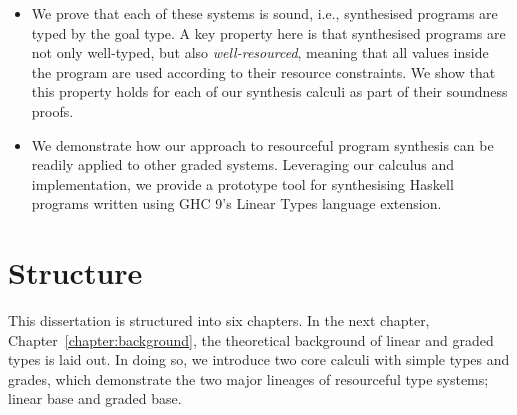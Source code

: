 \begin{itemize}
  \item We prove that each of these systems is sound, i.e., synthesised programs
        are typed by the goal type. A key property here is that synthesised programs 
        are not only well-typed, but also \emph{well-resourced}, meaning that all values  
        inside the program are used according to their resource constraints. We
        show that this property holds for each of our synthesis calculi as part
        of their soundness proofs. 

  \item We demonstrate how our approach to resourceful program synthesis can be
        readily applied to other graded systems. Leveraging our calculus and
        implementation, we provide a prototype tool for synthesising Haskell
        programs written using GHC 9's Linear Types language extension.
\end{itemize}
\section{Structure}

This dissertation is structured into six chapters. In the next chapter,
Chapter~\ref{chapter:background}, the theoretical background of linear and
graded types is laid out. In doing so, we introduce two core calculi with simple
types and grades, which demonstrate the two major lineages of resourceful type
systems; linear base and graded base.

